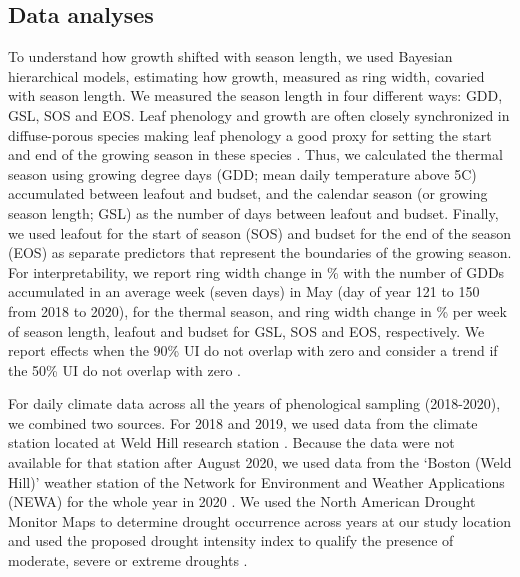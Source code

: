 \documentclass{article}\usepackage[]{graphicx}\usepackage[]{xcolor}
\begin{document}
\subsection*{Data analyses}
To understand how growth shifted with season length, we used Bayesian hierarchical models, estimating how growth, measured as ring width, covaried with season length. We measured the season length in four different ways: GDD, GSL, SOS and EOS. Leaf phenology and growth are often closely synchronized in diffuse-porous species \citep[e.g., \textit{Betula;}][]{cufar_treering_2008} making leaf phenology a good proxy for setting the start and end of the growing season in these species \citep{marchand_timing_2021,silvestro_roots_2025,suzuki_phenological_1996}. Thus, we calculated the thermal season using growing degree days (GDD; mean daily temperature above 5\degree C) accumulated between leafout and budset, and the calendar season (or growing season length; GSL) as the number of days between leafout and budset. Finally, we used leafout for the start of season (SOS) and budset for the end of the season (EOS) as separate predictors that represent the boundaries of the growing season. For interpretability, we report ring width change in \% with the number of GDDs accumulated in an average week (seven days) in May (day of year 121 to 150 from 2018 to 2020), for the thermal season, and ring width change in \% per week of season length, leafout and budset for GSL, SOS and EOS, respectively. We report effects when the 90\% UI do not overlap with zero and consider a trend if the 50\% UI do not overlap with zero \citep{gelman_regression_2020}.

For daily climate data across all the years of phenological sampling (2018-2020), we combined two sources. For 2018 and 2019, we used data from the climate station located at Weld Hill research station \citep{arnoldarboretum_weather_2026}. Because the data were not available for that station after August 2020, we used data from the `Boston (Weld Hill)' weather station of the Network for Environment and Weather Applications (NEWA) for the whole year in 2020 \citep[see Figure \ref{fig:climOverlap} for the climate overlap between the two stations in 2020;][]{carroll_network_2026}. We used the North American Drought Monitor Maps to determine drought occurrence across years at our study location and used the proposed drought intensity index to qualify the presence of moderate, severe or extreme droughts \citep{nationalcentersforenvironmentalinformationncei_north_2026}. 
\end{document}
